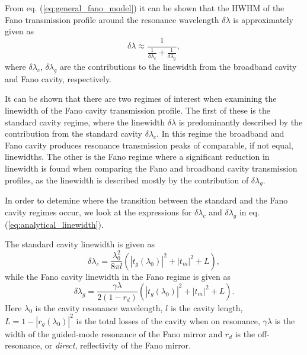 From eq. (\ref{eq:general_fano_model}) it can be shown that the HWHM of the Fano transmission profile around the resonance wavelength $\delta \lambda$ is approximately given as
\begin{equation}
    \delta \lambda \approx \frac{1}{\frac{1}{\delta \lambda_c} + \frac{1}{\delta \lambda_g}},
    \label{eq:analytical_linewidth}
\end{equation}
where $\delta \lambda_c$, $\delta \lambda_g$ are the contributions to the linewidth from the broadband cavity and Fano cavity, respectively. 

It can be shown that there are two regimes of interest when examining the linewidth of the Fano cavity transmission profile. The first of these is the standard cavity regime, where the linewidth $\delta \lambda$ is predominantly described by the contribution from the standard cavity $\delta \lambda_c$. In this regime the broadband and Fano cavity produces resonance transmission peaks of comparable, if not equal, linewidths. The other is the Fano regime where a significant reduction in linewidth is found when comparing the Fano and broadband cavity transmission profiles, as the linewidth is described mostly by the contribution of $\delta \lambda_g$. 

In order to detemine where the transition between the standard and the Fano cavity regimes occur, we look at the expressions for $\delta \lambda_c$ and $\delta \lambda_g$ in eq. (\ref{eq:analytical_linewidth}). 

The standard cavity linewidth is given as
\begin{equation}
    \delta \lambda_c = \frac{\lambda_0^2}{8 \pi l} (|t_g(\lambda_0)|^2 + |t_m|^2 + L),
    \label{eq:analytical_linewidth_broadband}
\end{equation}
while the Fano cavity linewidth in the Fano regime is given as
\begin{equation}
    \delta \lambda_g = \frac{\gamma \lambda}{2 (1-r_d)}(|t_g(\lambda_0)|^2 + |t_m|^2 + L).
\end{equation}
Here $\lambda_0$ is the cavity resonance wavelength, $l$ is the cavity length, $L = 1 - |r_g(\lambda_0)|^2$ is the total losses of the cavity when on resonance, $\gamma \lambda$ is the width of the guided-mode resonance of the Fano mirror and $r_d$ is the off-resonance, or \emph{direct}, reflectivity of the Fano mirror.

